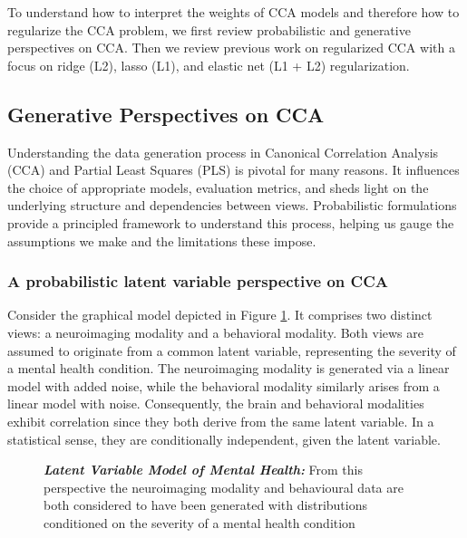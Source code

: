 To understand how to interpret the weights of CCA models and therefore how to regularize the CCA problem, we first review probabilistic and generative perspectives on CCA. Then we review previous work on regularized CCA with a focus on ridge (L2), lasso (L1), and elastic net (L1 + L2) regularization.

\subsection{Generative Perspectives on CCA}
Understanding the data generation process in Canonical Correlation Analysis (CCA) and Partial Least Squares (PLS) is pivotal for many reasons.
It influences the choice of appropriate models, evaluation metrics, and sheds light on the underlying structure and dependencies between views.
Probabilistic formulations provide a principled framework to understand this process, helping us gauge the assumptions we make and the limitations these impose.

\subsubsection{A probabilistic latent variable perspective on CCA}

Consider the graphical model depicted in Figure \ref{fig:mentalhealthselfsupervised}.
It comprises two distinct views: a neuroimaging modality and a behavioral modality.
Both views are assumed to originate from a common latent variable, representing the severity of a mental health condition.
The neuroimaging modality is generated via a linear model with added noise, while the behavioral modality similarly arises from a linear model with noise.
Consequently, the brain and behavioral modalities exhibit correlation since they both derive from the same latent variable.
In a statistical sense, they are conditionally independent, given the latent variable.

\begin{figure}
    \centering
    \caption[Latent Variable Model of Mental Health]{\textit{\textbf{Latent Variable Model of Mental Health:}} From this perspective the neuroimaging modality and behavioural data are both considered to have been generated with distributions conditioned on the severity of a mental health condition}\label{fig:mentalhealthselfsupervised}
\end{figure}

